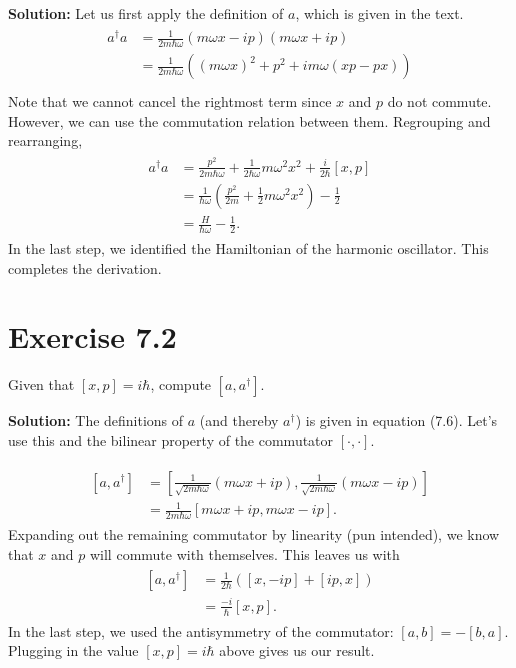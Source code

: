 \documentclass{book}
\begin{document}
    \textbf{Solution:} Let us first apply the definition of $a$, which is given in the text.
    \begin{align}
    \begin{aligned}
        a^\dagger a &= \frac{1}{2m\hbar\omega}(m\omega x-ip)(m\omega x+ip) \\
        &= \frac{1}{2m\hbar\omega} \left((m\omega x)^2 + p^2 + im\omega(xp-px)\right) \\
    \end{aligned}
    \end{align}
    Note that we cannot cancel the rightmost term since $x$ and $p$ do not commute. However, we can use the commutation relation between them. Regrouping and rearranging,
    \begin{align}
    \begin{aligned}
        a^\dagger a &= \frac{p^2}{2m\hbar\omega}+\frac{1}{2\hbar\omega}m \omega^2 x^2 + \frac{i}{2\hbar} [x,p] \\
        &= \frac{1}{\hbar\omega} \left(\frac{p^2}{2m} + \frac{1}{2}m\omega^2 x^2\right) - \frac{1}{2} \\
        &= \frac{H}{\hbar\omega}-\frac{1}{2}.
    \end{aligned}
    \end{align}
    In the last step, we identified the Hamiltonian of the harmonic oscillator. This completes the derivation.
    
\section*{Exercise 7.2}
    Given that $[x,p] = i\hbar$, compute $[a, a^\dagger]$.

    \textbf{Solution:} The definitions of $a$ (and thereby $a^\dagger$) is given in equation (7.6). Let's use this and the bilinear property of the commutator $[\cdot, \cdot]$.

    \begin{align}
    \begin{aligned}
        [a, a^\dagger] &= \left[\frac{1}{\sqrt{2m\hbar \omega}}\left(m\omega x + ip\right), \frac{1}{\sqrt{2m\hbar \omega}}\left(m\omega x - ip\right)\right] \\
        &= \frac{1}{2m\hbar \omega}\left[m\omega x + ip, m\omega x - ip\right].
    \end{aligned}
    \end{align}
    Expanding out the remaining commutator by linearity (pun intended), we know that $x$ and $p$ will commute with themselves. This leaves us with 
    \begin{align}
    \begin{aligned}
        [a, a^\dagger] &= \frac{1}{2\hbar} \left([x, -ip] + [ip,x]\right) \\
        &= \frac{-i}{\hbar}[x,p] .
    \end{aligned}
    \end{align}
    In the last step, we used the antisymmetry of the commutator: $[a,b] = -[b,a]$. Plugging in the value $[x,p] = i \hbar$ above gives us our result.
\end{document}
